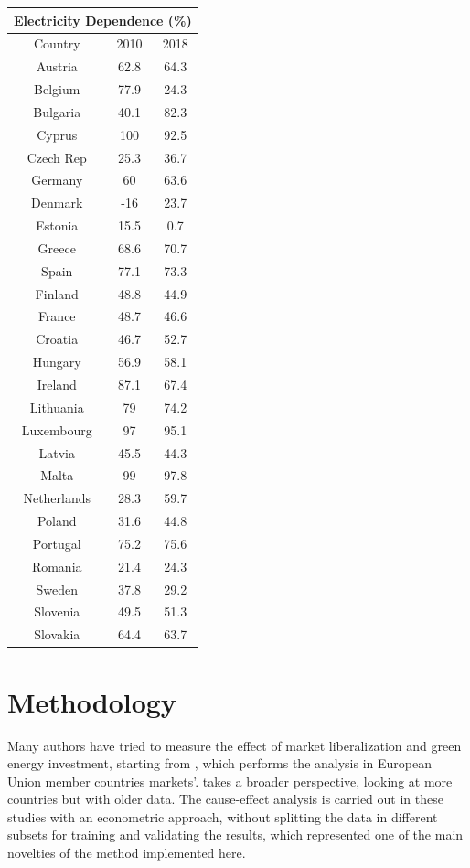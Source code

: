 \documentclass{book}
\begin{document}
\bigskip
\begin{table}[H]
\begin{center}
\begin{tabular}{|c|c|c|}
\hline
\multicolumn{3}{|c|}{Electricity Dependence (\%) }\\
\hline
Country & 2010 & 2018 \\
\hline
Austria & 62.8 & 64.3 \\
Belgium & 77.9 & 24.3 \\
Bulgaria & 40.1 & 82.3 \\
Cyprus & 100 & 92.5 \\
Czech Rep & 25.3 & 36.7\\
Germany & 60 & 63.6 \\
Denmark & -16 & 23.7 \\
Estonia & 15.5 & 0.7 \\
Greece & 68.6 & 70.7 \\
Spain & 77.1 &  73.3 \\
Finland & 48.8 & 44.9 \\
France & 48.7 & 46.6 \\
Croatia & 46.7 & 52.7 \\
Hungary &  56.9 & 58.1 \\
Ireland & 87.1 & 67.4 \\
Lithuania & 79 & 74.2 \\
Luxembourg & 97 & 95.1 \\
Latvia & 45.5 & 44.3 \\
Malta & 99 & 97.8 \\
Netherlands & 28.3 & 59.7 \\
Poland & 31.6 & 44.8 \\
Portugal & 75.2 & 75.6 \\
Romania & 21.4 & 24.3 \\
Sweden & 37.8 & 29.2 \\
Slovenia & 49.5 & 51.3 \\
Slovakia & 64.4 & 63.7 \\
\hline
\end{tabular}
\end{center}
\end{table}

\chapter{Methodology}

Many authors have tried to measure the effect of market liberalization and green energy investment, starting from \cite{moreno2012electricity}, which performs the analysis in European Union member countries markets'. \cite{nagayama2009electric} takes a broader perspective, looking at more countries but with older data. The cause-effect analysis is carried out in these studies with an econometric approach, without splitting the data in different subsets for training and validating the results, which represented one of the main novelties of the method implemented here.\\
\end{document}
